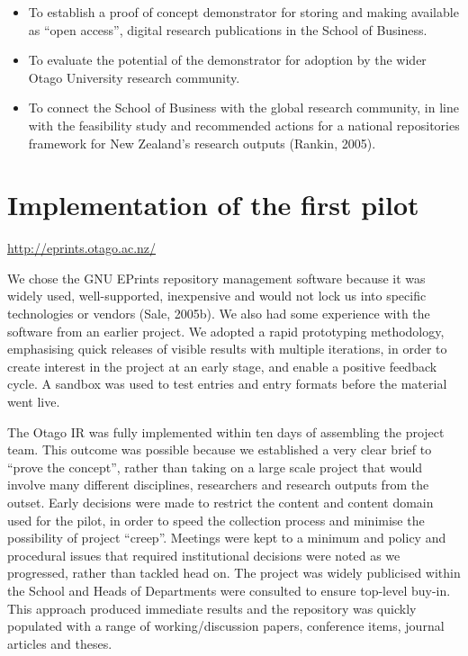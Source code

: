 \documentclass[12pt,pdftex,a4paper,titlepage]{article}
\begin{document}
\begin{itemize}

	\item To establish a proof of concept demonstrator for storing and making available as ``open access'', digital research publications in the School of Business.

	\item To evaluate the potential of the demonstrator for adoption by the wider Otago University research community.

	\item To connect the School of Business with the global research community, in line with the feasibility study and recommended actions for a national repositories framework for New Zealand's research outputs (Rankin, 2005).

\end{itemize}


\section{Implementation of the first pilot}

\url{http://eprints.otago.ac.nz/}

We chose the GNU EPrints repository management software because it was widely used, well-supported, inexpensive and would not lock us into specific technologies or vendors (Sale, 2005b). We also had some experience with the software from an earlier project. We adopted a rapid prototyping methodology, emphasising quick releases of visible results with multiple iterations, in order to create interest in the project at an early stage, and enable a positive feedback cycle. A sandbox was used to test entries and entry formats before the material went live.

The Otago IR was fully implemented within ten days of assembling the project team. This outcome was possible because we established a very clear brief to ``prove the concept'', rather than taking on a large scale project that would involve many different disciplines, researchers and research outputs from the outset. Early decisions were made to restrict the content and content domain used for the pilot, in order to speed the collection process and minimise the possibility of project ``creep''. Meetings were kept to a minimum and policy and procedural issues that required institutional decisions were noted as we progressed, rather than tackled head on. The project was widely publicised within the School and Heads of Departments were consulted to ensure top-level buy-in. This approach produced immediate results and the repository was quickly populated with a range of working/discussion papers, conference items, journal articles and theses.
\end{document}
